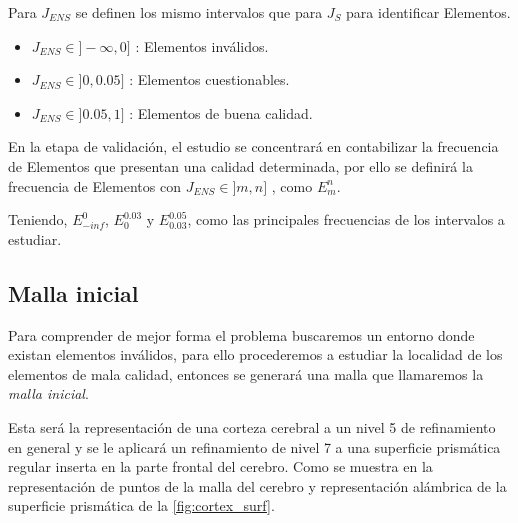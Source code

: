 


Para $J_{ENS}$ se definen los mismo intervalos que para $J_S$ para identificar Elementos.

\begin{itemize}
	\item $J_{ENS} \in ]-\infty, 0]$ : Elementos inválidos.
	\item $J_{ENS} \in ]0, 0.05]$ : Elementos cuestionables.
	\item $J_{ENS} \in ]0.05, 1]$ : Elementos de buena calidad.
\end{itemize}

En la etapa de validación, el estudio se concentrará en contabilizar la frecuencia de Elementos que presentan una calidad determinada, por ello se definirá la frecuencia de Elementos con $J_{ENS} \in ]m, n]$ , como $E^{n}_{m}$.

Teniendo, $E_{-inf}^{0}$, $E_{0}^{0.03}$ y $E_{0.03}^{0.05}$, como las principales frecuencias de los intervalos a estudiar.

\subsection{Malla inicial}

Para comprender de mejor forma el problema buscaremos un entorno donde existan elementos inválidos, para ello procederemos a estudiar la localidad de los elementos de mala calidad, entonces se generará una malla que llamaremos la \textit{malla inicial}.

Esta será la representación de una corteza cerebral a un nivel 5 de refinamiento en general y se le aplicará un refinamiento de nivel 7 a una superficie prismática regular inserta en la parte frontal del cerebro. Como se muestra en la representación de puntos de la malla del cerebro y representación alámbrica de la superficie prismática de la \autoref{fig:cortex_surf}.

